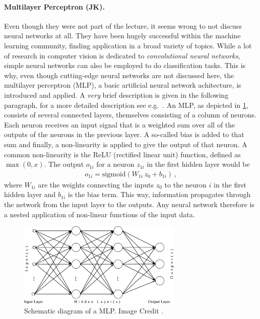 \documentclass[12pt, a4paper]{scrartcl}
\begin{document}
\paragraph{Multilayer Perceptron (JK).} Even though they were not part of the lecture, it seems wrong to not discuss neural networks at all. They have been hugely successful within the machine learning community, finding application in a broad variety of topics. While a lot of research in computer vision is dedicated to \emph{convolutional neural networks}, simple neural networks can also be employed to do classification tasks.
This is why, even though cutting-edge neural networks are not discussed here, the multilayer perceptron (MLP), a basic artificial neural network achitecture, is introduced and applied. A \emph{very} brief description is given in the following paragraph, for a more detailed description see e.g.\ \cite{bishop2006prm}.
An MLP, as depicted in \cref{fig:mlp}, consists of several connected layers, themselves consisting of a column of neurons. Each neuron receives an input signal that is a weighted sum over all of the outputs of the neurons in the previous layer. A so-called bias is added to that sum and finally, a non-linearity is applied to give the output of that neuron.
A common non-linearity is the ReLU (rectified linear unit) function, defined as $\max(0, x)$.
 The output $o_{1i}$ for a neuron $z_{1i} $ in the first hidden layer would be
\begin{align*}
	o_{1i} = \text{sigmoid}\left( W_{1i} \, z_{0} + b_{1i} \right) \, ,
\end{align*}
where $W_{1i}$ are the weights connecting the inputs  $z_{0}$ to the neuron $i$ in the first hidden layer and $b_{1i}$ is the bias term. This way, information propagates through the network from the input layer to the outputs. Any neural network therefore is a nested application of non-linear functions of the input data.

\begin{figure}
	\centering
	\includegraphics[width=0.7\textwidth]{mlp}
	\caption{Schematic diagram of a MLP. Image Credit \citep{saracoglu2010color}.}
	\label{fig:mlp}
\end{figure}
\end{document}

